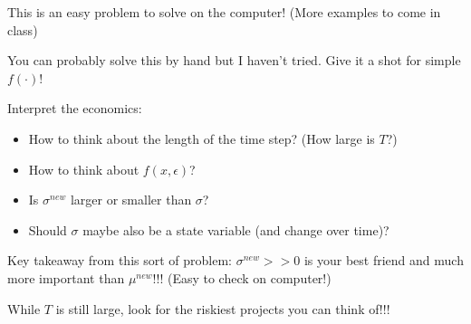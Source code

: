 \documentclass[11pt, aspectratio=169]{beamer}
\newenvironment{witemize}{\itemize\addtolength{\itemsep}{10pt}}{\enditemize}
\begin{document}
\begin{frame}{}

\begin{witemize}
\item This is an easy problem to solve on the computer! (More examples to come in class)

	{\footnotesize You can probably solve this by hand but I haven't tried. Give it a shot for simple $f(\cdot)$!}

\item Interpret the economics:
\begin{itemize}
\item How to think about the length of the time step? (How large is $T$?)
\item How to think about $f(x, \epsilon)$?
\item Is $\sigma^{new}$ larger or smaller than $\sigma$?
\item Should $\sigma$ maybe also be a state variable (and change over time)?
\end{itemize}

\item Key takeaway from this sort of problem: $\sigma^{new} >> 0$ is your best friend and much more important than $\mu^{new}$!!! (Easy to check on computer!)

\item While $T$ is still large, look for the riskiest projects you can think of!!! 
\end{witemize}
\end{frame}
\end{document}
